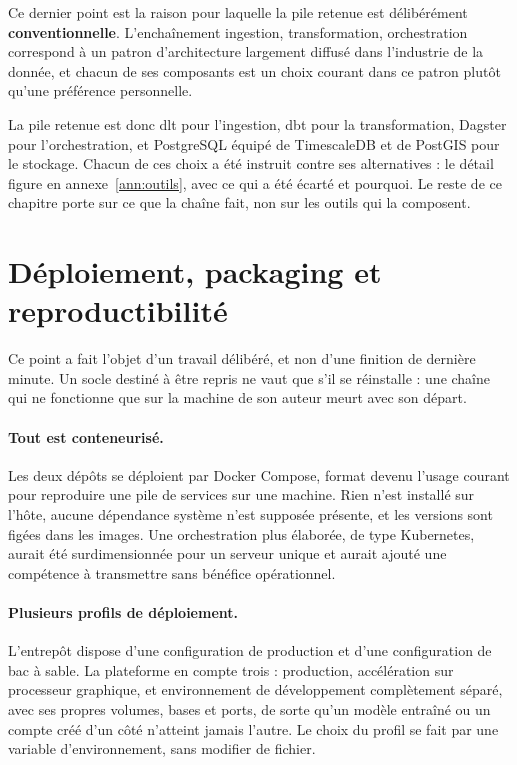 Ce dernier point est la raison pour laquelle la pile retenue est délibérément
\textbf{conventionnelle}. L'enchaînement ingestion, transformation, orchestration correspond à
un patron d'architecture largement diffusé dans l'industrie de la donnée, et chacun de ses
composants est un choix courant dans ce patron plutôt qu'une préférence personnelle.


La pile retenue est donc dlt pour l'ingestion, dbt pour la transformation, Dagster pour
l'orchestration, et PostgreSQL équipé de TimescaleDB et de PostGIS pour le stockage. Chacun de
ces choix a été instruit contre ses alternatives : le détail figure en annexe~\ref{ann:outils},
avec ce qui a été écarté et pourquoi. Le reste de ce chapitre porte sur ce que la chaîne fait,
non sur les outils qui la composent.

\section{Déploiement, packaging et reproductibilité}

Ce point a fait l'objet d'un travail délibéré, et non d'une finition de dernière minute. Un
socle destiné à être repris ne vaut que s'il se réinstalle : une chaîne qui ne fonctionne que
sur la machine de son auteur meurt avec son départ.

\paragraph{Tout est conteneurisé.} Les deux dépôts se déploient par Docker Compose, format
devenu l'usage courant pour reproduire une pile de services sur une machine. Rien n'est installé
sur l'hôte, aucune dépendance système n'est supposée présente, et les versions sont figées dans
les images. Une orchestration plus élaborée, de type Kubernetes, aurait été surdimensionnée pour
un serveur unique et aurait ajouté une compétence à transmettre sans bénéfice opérationnel.

\paragraph{Plusieurs profils de déploiement.} L'entrepôt dispose d'une configuration de
production et d'une configuration de bac à sable. La plateforme en compte trois : production,
accélération sur processeur graphique, et environnement de développement complètement séparé,
avec ses propres volumes, bases et ports, de sorte qu'un modèle entraîné ou un compte créé d'un
côté n'atteint jamais l'autre. Le choix du profil se fait par une variable d'environnement, sans
modifier de fichier.

